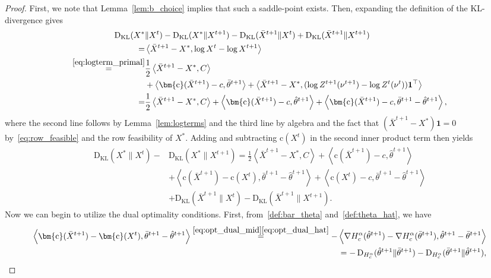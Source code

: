\documentclass[10pt]{article}
\newcommand{\DHa}{\D_{H_c^\alpha}}
\newcommand{\inner}[2]{\left\langle #1,#2\right\rangle}
\newcommand{\D}{\operatorname{D}}
\theoremstyle{plain}
\theoremstyle{definition}
\theoremstyle{remark}
\newcommand{\KL}{\mathrm{D}_\mathrm{KL}}
\newcommand{\one}{\mathbf{1}}
\newcommand{\col}{\bm{\mathrm{c}}}
\begin{document}
\begin{proof}
    First, we note that Lemma~\ref{lem:b_choice} implies that such a saddle-point exists. Then, expanding the definition of the KL-divergence gives
    \begin{align*}
        \KL(X^*&\|X^t)-\KL(X^*\|X^{t+1}) - \KL(\bar X^{t+1}\|X^t) + \KL(\bar X^{t+1}\|X^{t+1}) \\
        =& \inner{\bar X^{t+1}-X^*}{\log X^t-\log X^{t+1}}\\
        \stackrel{\eqref{eq:logterm_primal}}=&\frac{1}{2}\inner{\bar X^{t+1}-X^*}{C}\\
        &+\inner{\col(\bar X^{t+1})-c}{\bar\theta^{t+1}}
        +\inner{\bar X^{t+1}-X^*}{(\log Z^{t+1}(\nu^{t+1})-\log Z^{t}(\nu^t))\one^\top}\\
        =&\frac{1}{2}\inner{\bar X^{t+1}-X^*}{C}+\inner{\col(\bar X^{t+1})-c}{\hat\theta^{t+1}}
        +\inner{\col(\bar X^{t+1})-c}{\bar\theta^{t+1}-\hat\theta^{t+1}}
        ,
        \end{align*}
        where the second line follows by Lemma~\ref{lem:logterms} and the third line by algebra and the fact that $(\bar X^{t+1}-X^*)\one=0$ by~\eqref{eq:row_feasible} and the row feasibility of $X^*$. Adding and subtracting $\col(X^t)$ in the second inner product term then yields
        \begin{align}
        \nonumber\KL(X^*\|X^t)-&\KL(X^*\|X^{t+1})=\frac{1}{2}\inner{\bar X^{t+1}-X^*}{C}+\inner{\col(\bar X^{t+1})-c}{\hat\theta^{t+1}}\\
        \nonumber&+\inner{\col(\bar X^{t+1})-\col(X^t)}{\bar\theta^{t+1}-\hat\theta^{t+1}}
        +\inner{\col( X^t)-c}{\bar\theta^{t+1}-\hat\theta^{t+1}}\\
        &
        +\KL(\bar X^{t+1}\|X^t)-\KL(\bar X^{t+1}\|X^{t+1}).\label{eq:kl_difference_e7}
    \end{align}
    Now we can begin to utilize the dual optimality conditions. First, from~\eqref{def:bar_theta} and~\eqref{def:theta_hat}, we have
    \begin{align}
        \nonumber\inner{\col(\bar X^{t+1})-\col(X^t)}{\bar\theta^{t+1}-\hat\theta^{t+1}}\stackrel{\eqref{eq:opt_dual_mid}\eqref{eq:opt_dual_hat}}=-\inner{\nabla H_c^\alpha(\hat\theta^{t+1})-\nabla H_c^\alpha(\bar\theta^{t+1})}{\hat\theta^{t+1}-\bar\theta^{t+1}}\\
        =-\DHa(\hat\theta^{t+1}\|\bar\theta^{t+1})-\DHa(\bar\theta^{t+1}\|\hat\theta^{t+1})\label{eq:dual_div_difference},
    \end{align}

\end{proof}
\end{document}
